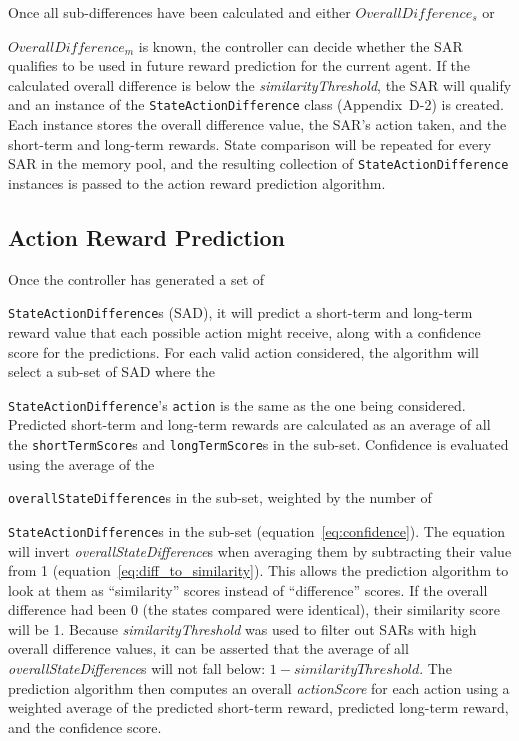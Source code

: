 Once all sub-differences have been calculated and either $OverallDifference_{s}$ or

\noindent
$OverallDifference_{m}$ is known, the controller can decide whether the SAR qualifies to be used in future reward prediction for the current agent.
If the calculated overall difference is below the \textit{similarityThreshold}, the SAR will qualify and an instance of the \texttt{StateActionDifference} class (Appendix~D-2) is created.
Each instance stores the overall difference value, the SAR's action taken, and the short-term and long-term rewards.
State comparison will be repeated for every SAR in the memory pool, and the resulting collection of \texttt{StateActionDifference} instances is passed to the action reward prediction algorithm.



\subsection{Action Reward Prediction}
Once the controller has generated a set of

\noindent
\texttt{StateActionDifference}s (SAD), it will predict a short-term and long-term reward value that each possible action might receive, along with a confidence score for the predictions.
For each valid action considered, the algorithm will select a sub-set of SAD where the

\noindent
\texttt{StateActionDifference}'s \texttt{action} is the same as the one being considered.
Predicted short-term and long-term rewards are calculated as an average of all the \texttt{shortTermScore}s and \texttt{longTermScore}s in the sub-set.
Confidence is evaluated using the average of the

\noindent
\texttt{overallStateDifference}s in the sub-set, weighted by the number of

\noindent
\texttt{StateActionDifference}s in the sub-set (equation~\ref{eq:confidence}).
The equation will invert \textit{overallStateDifference}s when averaging them by subtracting their value from 1 (equation~\ref{eq:diff_to_similarity}).
This allows the prediction algorithm to look at them as ``similarity'' scores instead of ``difference'' scores.
If the overall difference had been 0 (the states compared were identical), their similarity score will be 1.
Because \textit{similarityThreshold} was used to filter out SARs with high overall difference values, it can be asserted that the average of all \textit{overallStateDifference}s will not fall below: $1 - similarityThreshold$.
The prediction algorithm then computes an overall \textit{actionScore} for each action using a weighted average of the predicted short-term reward, predicted long-term reward, and the confidence score.

